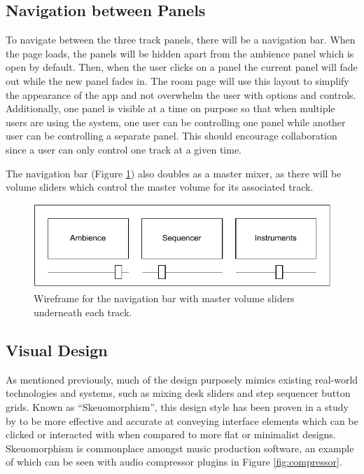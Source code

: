 \subsection{Navigation between Panels}
To navigate between the three track panels, there will be a navigation bar. When the page loads, the panels will be hidden apart from the ambience panel which is open by default. Then, when the user clicks on a panel the current panel will fade out while the new panel fades in. The room page will use this layout to simplify the appearance of the app and not overwhelm the user with options and controls. Additionally, one panel is visible at a time on purpose so that when multiple users are using the system, one user can be controlling one panel while another user can be controlling a separate panel. This should encourage collaboration since a user can only control one track at a given time.

The navigation bar (Figure \ref{fig:navigation-wireframe}) also doubles as a master mixer, as there will be volume sliders which control the master volume for its associated track.

\begin{figure}[htb]
    \centering
    \includegraphics[width=0.5\linewidth]{images/design/navigation-wireframe.pdf}    
    \caption{Wireframe for the navigation bar with master volume sliders underneath each track.}
    \label{fig:navigation-wireframe}
\end{figure}

\subsection{Visual Design}
As mentioned previously, much of the design purposely mimics existing real-world technologies and systems, such as mixing desk sliders and step sequencer button grids. Known as “Skeuomorphism”, this design style has been proven in a study by \cite{urbano2022skeuomorphism} to be more effective and accurate at conveying interface elements which can be clicked or interacted with when compared to more flat or minimalist designs. Skeuomorphism is commonplace amongst music production software, an example of which can be seen with audio compressor plugins in Figure \ref{fig:compressor}.

